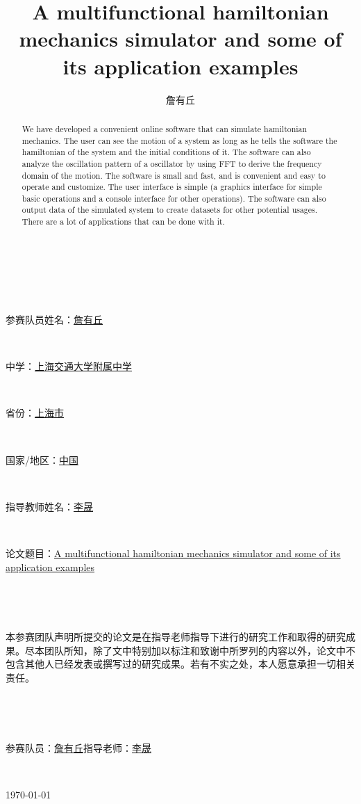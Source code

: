\documentclass[12pt]{article}
\title{A multifunctional hamiltonian mechanics simulator and some of its application examples}
\author{詹有丘}
\begin{document}
\Huge

~\par
~\par
\noindent 参赛队员姓名：\underline{詹有丘}\par
~\par
\noindent 中学：\underline{上海交通大学附属中学}\par
~\par
\noindent 省份：\underline{上海市}\par
~\par
\noindent 国家/地区：\underline{中国}\par
~\par
\noindent 指导教师姓名：\underline{李晟}\par
~\par
\noindent 论文题目：\ul{A multifunctional hamiltonian mechanics simulator and some of its application examples}

\newpage

\huge

~\par
~\par
\setlength{\parindent}{5ex}
本参赛团队声明所提交的论文是在指导老师指导下进行的研究工作和取得的研究成果。尽本团队所知，除了文中特别加以标注和致谢中所罗列的内容以外，论文中不包含其他人已经发表或撰写过的研究成果。若有不实之处，本人愿意承担一切相关责任。\par
~\par
~\par
参赛队员：\underline{詹有丘}\qquad 指导老师：\underline{李晟}\par
~\par
\begin{flushright}\chinesedate\today\end{flushright}

\normalsize

\setlength{\parindent}{1.5em}

\maketitle

\begin{abstract}
We have developed a convenient online software that can simulate hamiltonian mechanics.
The user can see the motion of a system as long as he tells the software
the hamiltonian of the system and the initial conditions of it.
The software can also analyze the oscillation pattern of a oscillator
by using FFT to derive the frequency domain of the motion.
The software is small and fast, and is convenient and easy to operate and customize.
The user interface is simple (a graphics interface for simple basic operations
and a console interface for other operations).
The software can also output data of the simulated system to create datasets
for other potential usages.
There are a lot of applications that can be done with it.
\end{abstract}
\end{document}
